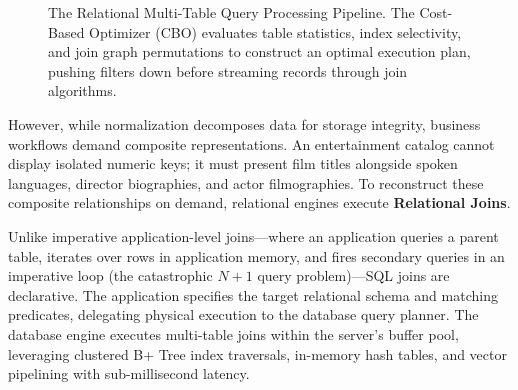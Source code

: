 \documentclass[10pt,twocolumn,letterpaper]{article}
\begin{document}
\begin{figure}[htbp]
\centering
{}
\caption{The Relational Multi-Table Query Processing Pipeline. The Cost-Based Optimizer (CBO) evaluates table statistics, index selectivity, and join graph permutations to construct an optimal execution plan, pushing filters down before streaming records through join algorithms.}
\label{fig:pipeline}
\end{figure}

However, while normalization decomposes data for storage integrity, business workflows demand composite representations. An entertainment catalog cannot display isolated numeric keys; it must present film titles alongside spoken languages, director biographies, and actor filmographies. To reconstruct these composite relationships on demand, relational engines execute \textbf{Relational Joins}.

Unlike imperative application-level joins---where an application queries a parent table, iterates over rows in application memory, and fires secondary queries in an imperative loop (the catastrophic $N+1$ query problem)---SQL joins are declarative. The application specifies the target relational schema and matching predicates, delegating physical execution to the database query planner. The database engine executes multi-table joins within the server's buffer pool, leveraging clustered B+ Tree index traversals, in-memory hash tables, and vector pipelining with sub-millisecond latency.
\end{document}
